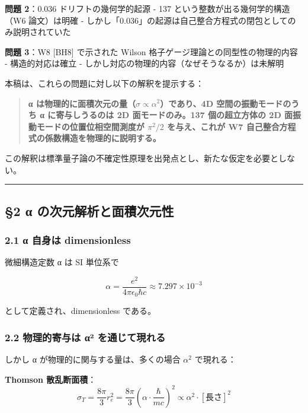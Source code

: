 \documentclass[
  11pt]{ltjsarticle}
\begin{document}
\textbf{問題 2}：0.036 ドリフトの幾何学的起源 - 137
という整数が出る幾何学的構造（W6 論文）は明確 -
しかし「0.036」の起源は自己整合方程式の閉包としてのみ説明されていた

\textbf{問題 3}：W8 {[}BH8{]} で示された Wilson
格子ゲージ理論との同型性の物理的内容 - 構造的対応は確立 -
しかし対応の物理的内容（なぜそうなるか）は未解明

本稿は、これらの問題に対し以下の解釈を提示する：

\begin{quote}
\textbf{α
は物理的に面積次元の量（\(\sigma \propto \alpha^2\)）であり、4D
空間の振動モードのうち α に寄与しうるのは 2D 面モードのみ。137
個の超立方体の 2D 面振動モードの位置位相空間測度が \(\pi^2/2\)
を与え、これが W7 自己整合方程式の係数構造を物理的に説明する。}
\end{quote}

この解釈は標準量子論の不確定性原理を出発点とし、新たな仮定を必要としない。

\begin{center}\rule{0.5\linewidth}{0.5pt}\end{center}

\subsection{§2 α
の次元解析と面積次元性}\label{ux3b1-ux306eux6b21ux5143ux89e3ux6790ux3068ux9762ux7a4dux6b21ux5143ux6027}

\subsubsection{2.1 α 自身は
dimensionless}\label{ux3b1-ux81eaux8eabux306f-dimensionless}

微細構造定数 α は SI 単位系で

\[\alpha = \frac{e^2}{4\pi\epsilon_0 \hbar c} \approx 7.297 \times 10^{-3}\]

として定義され、dimensionless である。

\subsubsection{2.2 物理的寄与は α²
を通じて現れる}\label{ux7269ux7406ux7684ux5bc4ux4e0eux306f-ux3b1uxb2-ux3092ux901aux3058ux3066ux73feux308cux308b}

しかし α が物理的に関与する量は、多くの場合 \(\alpha^2\) で現れる：

\textbf{Thomson 散乱断面積}：
\[\sigma_T = \frac{8\pi}{3} r_e^2 = \frac{8\pi}{3} \left(\alpha \cdot \frac{\hbar}{mc}\right)^2 \propto \alpha^2 \cdot [\text{長さ}]^2\]
\end{document}
